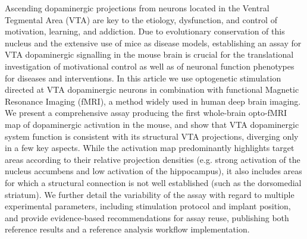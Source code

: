 Ascending dopaminergic projections from neurons located in the Ventral Tegmental Area (VTA) are key to the etiology, dysfunction, and control of motivation, learning, and addiction.
Due to evolutionary conservation of this nucleus and the extensive use of mice as disease models, establishing an assay for VTA dopaminergic signalling in the mouse brain is crucial for the translational investigation of motivational control as well as of neuronal function phenotypes for diseases and interventions.
In this article we use optogenetic stimulation directed at VTA dopaminergic neurons in combination with functional Magnetic Resonance Imaging (fMRI), a method widely used in  human deep brain imaging.
We present a comprehensive assay producing the first whole-brain opto-fMRI map of dopaminergic activation in the mouse, and show that VTA dopaminergic system function is consistent with its structural VTA projections, diverging only in a few key aspects.
While the activation map predominantly highlights target areas according to their relative projection densities (e.g. strong activation of the nucleus accumbens and low activation of the hippocampus), it also includes areas for which a structural connection is not well established (such as the dorsomedial striatum).
We further detail the variability of the assay with regard to multiple experimental parameters, including stimulation protocol and implant position, and provide evidence-based recommendations for assay reuse, publishing both reference results and a reference analysis workflow implementation.
